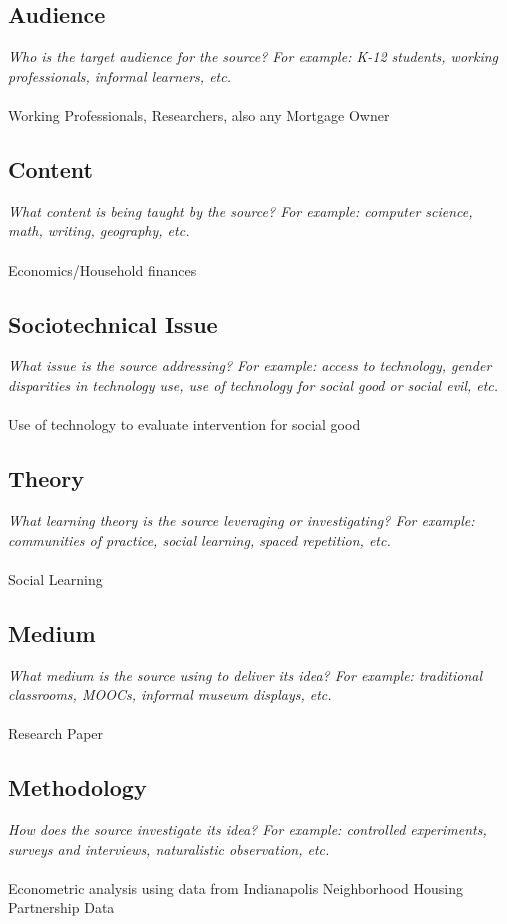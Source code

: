 \documentclass[12pt, final]{article}
\begin{document}
\subsection{Audience}
\textit{Who is the target audience for the source? For example: K-12 students, working professionals, informal learners, etc.}
\\
\\
Working Professionals, Researchers, also any Mortgage Owner

\subsection{Content}
\textit{What content is being taught by the source? For example: computer science, math, writing, geography, etc.}
\\
\\
Economics/Household finances

\subsection{Sociotechnical Issue}
\textit{What issue is the source addressing? For example: access to technology, gender disparities in technology use, use of technology for social good or social evil, etc.}
\\
\\
Use of technology to evaluate intervention for social good

\subsection{Theory}
\textit{What learning theory is the source leveraging or investigating? For example: communities of practice, social learning, spaced repetition, etc.}
\\
\\
Social Learning

\subsection{Medium}
\textit{What medium is the source using to deliver its idea? For example: traditional classrooms, MOOCs, informal museum displays, etc.}
\\
\\
Research Paper

\subsection{Methodology}
\textit{How does the source investigate its idea? For example: controlled experiments, surveys and interviews, naturalistic observation, etc.}
\\
\\
Econometric analysis using data from Indianapolis Neighborhood Housing Partnership Data
\end{document}

